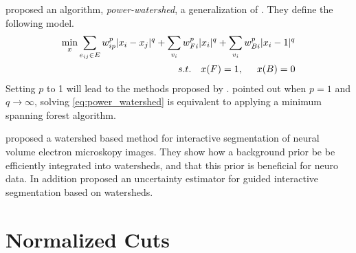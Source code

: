 \citet{couprie_2011_pami} proposed an algorithm, \emph{power-watershed}, a generalization of \citep{RANDOM_WALKER, GRAPH_CUT,WATHERSHEDS,sinop_2007_iccv}.
They define the following model.
\begin{align}\label{eq:power_watershed}
\min_x \sum_{e_{ij} \in E}  w_{ip}^p |x_i-x_j|^q + \sum_{v_i } w_{Fi}^p |x_i|^q + \sum_{v_i } w_{Bi}^p |x_i-1|^q \\
s.t. \hspace{0.35cm} x(F)=1, \hspace{0.5cm} x(B)=0
\end{align}
Setting $p$ to 1 will lead to the methods proposed by \citet{sinop_2007_iccv}.
 pointed out when $p=1$ and $q \rightarrow \infty$, solving
\cref{eq:power_watershed} is equivalent to applying a minimum spanning forest algorithm.




\citet{straehle_2011_miccai} proposed a watershed based method for interactive segmentation
of neural volume electron  microskopy images.
They show how a background prior be be efficiently integrated into watersheds,
and that this prior is beneficial for neuro data.
In addition \citet{straehle_2012_cvpr} proposed an uncertainty estimator for
guided interactive segmentation based on watersheds.




\section{Normalized Cuts}


